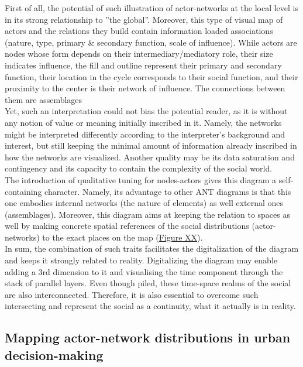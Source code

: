 \documentclass[11pt]{report}
\begin{document}
{{{{First of all, the potential of such illustration of actor-networks at the local level is in its strong relationship to ”the global”. Moreover, this type of  visual map of actors and the relations they build contain information loaded associations (nature, type, primary \& secondary function, scale of influence).
While actors are nodes whose form depends on their intermediary/mediatory role, their size indicates influence, the fill and outline represent their primary and secondary function, their location in the cycle corresponds to their social function, and their proximity to the center is their network of influence.
The connections between them are assemblages
\\

Yet, such an interpretation could not bias the potential reader, as it is without any notion of value or meaning initially inscribed in it. Namely, the networks might be interpreted differently according to the interpreter’s background and interest, but still keeping the minimal amount of information already inscribed in how the networks are visualized. Another quality may be its data saturation and contingency and its capacity to contain the complexity of the social world.
\\

The introduction of qualitative tuning for nodes-actors gives this diagram a self-containing character. Namely, its advantage to other ANT diagrams is that this one embodies internal networks (the nature of elements) as well external ones (assemblages). Moreover, this diagram aims at keeping the relation to spaces as well by making concrete spatial references of the social distributions (actor-networks) to the exact places on the map (\href{ref}{Figure XX}).
\\

In sum, the combination of such traits facilitates the digitalization of the diagram and keeps it strongly related to reality.  Digitalizing the diagram may enable adding a 3rd dimension to it and visualising the time component through the stack of parallel layers. Even though piled, these time-space realms of the social are also interconnected. Therefore, it is also essential to overcome such intersecting and represent the social as a continuity, what it actually is in reality. 
  
\subsection{Mapping actor-network distributions in urban decision-making}

}}}}
\end{document}
